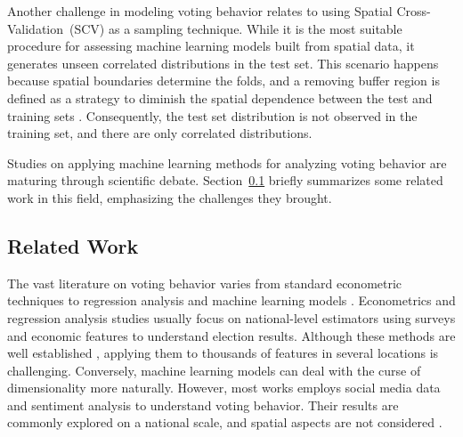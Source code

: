 \documentclass[runningheads]{llncs}
\begin{document}
Another challenge in modeling voting behavior relates to using Spatial Cross-Validation~(SCV) as a sampling technique. While it is the most suitable procedure for assessing machine learning models built from spatial data, it generates unseen correlated distributions in the test set. This scenario happens because spatial boundaries determine the folds, and a removing buffer region is defined as a strategy to diminish the spatial dependence between the test and training sets \cite{tiago2021graph,ploton2020}. Consequently, the test set distribution is not observed in the training set, and there are only correlated distributions.


Studies on applying machine learning methods for analyzing voting behavior are maturing through scientific debate. Section~\ref{subsec:related_work} briefly summarizes some related work in this field, emphasizing the challenges they brought.



\subsection{Related Work}
\label{subsec:related_work}

The vast literature on voting behavior varies from standard econometric techniques \cite{graefe2019accuracy} to regression analysis \cite{stewart2021scale} and machine learning models \cite{chauhan2021emergence,li2019deep}. Econometrics and regression analysis studies usually focus on national-level estimators using surveys and economic features to understand election results. Although these methods are well established \cite{graefe2019accuracy}, applying them to thousands of features in several locations is challenging. Conversely, machine learning models can deal with the curse of dimensionality more naturally. However, most works employs social media data and sentiment analysis to understand voting behavior. Their results are commonly explored on a national scale, and spatial aspects are not considered \cite{chauhan2021emergence}.
\end{document}
